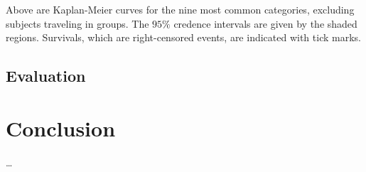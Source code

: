 \documentclass[12pt,titlepage]{article}
\begin{document}
      Above are Kaplan-Meier curves for the nine most common categories,
      excluding subjects traveling in groups. The $95\%$ credence intervals are
      given by the shaded regions. Survivals, which are right-censored events,
      are indicated with tick marks.

    \subsection{Evaluation}
      
      
      

  \section{Conclusion}
    \ldots




  
  
\end{document}
